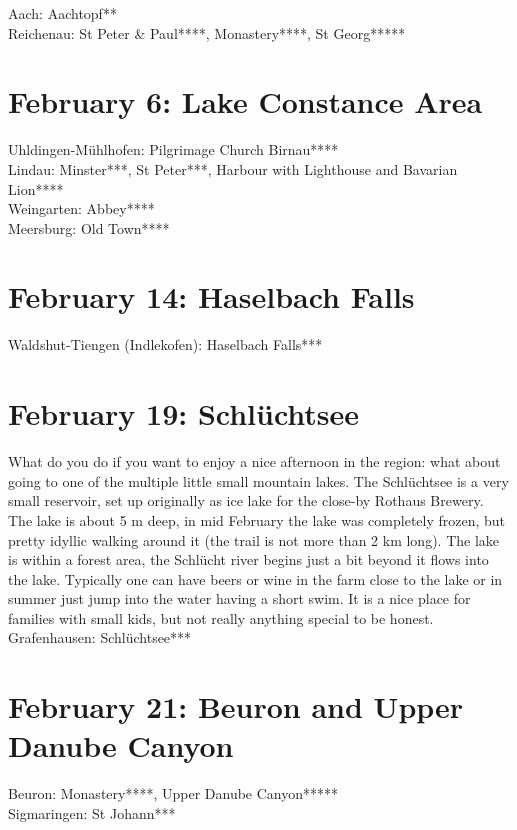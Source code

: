 Aach: Aachtopf**\\
Reichenau: St Peter \& Paul****, Monastery****, St Georg*****\\

\section{February 6: Lake Constance Area}
\label{2021:LakeConstance}

Uhldingen-M\"uhlhofen: Pilgrimage Church Birnau****\\
Lindau: Minster***, St Peter***, Harbour with Lighthouse and Bavarian Lion****\\
Weingarten: Abbey****\\
Meersburg: Old Town****

\section{February 14: Haselbach Falls}
\label{2021:Haselbach}

Waldshut-Tiengen (Indlekofen): Haselbach Falls***

\section{February 19: Schl\"uchtsee}
\label{2021:Schluechtsee}

What do you do if you want to enjoy a nice afternoon in the region: what about going to one of the multiple little small mountain lakes. The Schl\"uchtsee is a very small reservoir, set up originally as ice lake for the close-by Rothaus Brewery. The lake is about 5 m deep, in mid February the lake was completely frozen, but pretty idyllic walking around it (the trail is not more than 2 km long). The lake is within a forest area, the Schl\"ucht river begins just a bit beyond it flows into the lake. Typically one can have beers or wine in the farm close to the lake or in summer just jump into the water having a short swim. It is a nice place for families with small kids, but not really anything special to be honest.\\

Grafenhausen: Schl\"uchtsee***

\section{February 21: Beuron and Upper Danube Canyon}
\label{2021:Beuron}

Beuron: Monastery****, Upper Danube Canyon*****\\
Sigmaringen: St Johann***

